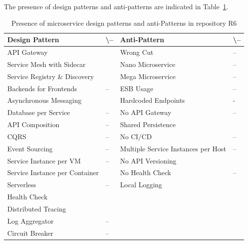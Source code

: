 \documentclass{Configuration_Files/PoliMi3i_thesis}
\newcommand{\cmark}{\ding{51}}%
\begin{document}
The presence of design patterns and anti-patterns are indicated in Table~\ref{table:R6_result}.

\begin{table}[H]
\centering 
    \begin{tabular}{ 
  | >{\centering\arraybackslash} m{16em} 
  | >{\centering\arraybackslash} m{2.2em} 
  | >{\centering\arraybackslash} m{16em} 
  | >{\centering\arraybackslash} m{2.2em} | }
    \hline
    \rowcolor{bluepoli!40}
    \textbf{Design Pattern} & \cmark \textbackslash – & \textbf{Anti-Pattern} & \cmark \textbackslash – \T\B \\
    \hline \hline
    API Gateway & \cmark & Wrong Cut & – \T\B\\
    \hline
    \rowcolor{bluepoli!10}
    Service Mesh with Sidecar & \cmark & Nano Microservice & – \T\B \\
    \hline
    Service Registry \& Discovery & \cmark & Mega Microservice & – \T\B \\
    \hline
    \rowcolor{bluepoli!10}
    Backends for Frontends & – & ESB Usage & – \T\B \\
    \hline
    Asynchronous Messaging & \cmark & Hardcoded Endpoints & - \T\B \\
    \hline
    \rowcolor{bluepoli!10}
    Database per Service & – & No API Gateway & – \T\B \\
    \hline
    API Composition & – & Shared Persistence & \cmark \T\B \\
    \hline
    \rowcolor{bluepoli!10}
    CQRS & – & No CI/CD & – \T\B \\
    \hline
    Event Sourcing & – & Multiple Service Instances per Host & – \T\B \\
    \hline
    \rowcolor{bluepoli!10}
    Service Instance per VM & – & No API Versioning & \cmark \T\B \\
    \hline
    Service Instance per Container & \cmark & No Health Check & – \T\B \\
    \hline
    \rowcolor{bluepoli!10}
    Serverless & – & Local Logging & \cmark \T\B \\
    \hline
    Health Check & \cmark &  & \T\B \\
    \hline
    \rowcolor{bluepoli!10}
    Distributed Tracing & \cmark & & \T\B \\
    \hline
    Log Aggregator & – &  & \T\B \\
    \hline
    \rowcolor{bluepoli!10}
    Circuit Breaker & – &  & \T\B \\
    \hline
    \end{tabular}
    \\[10pt]
    \caption{Presence of microservice design patterns and anti-Patterns in repository R6}
    \label{table:R6_result}
\end{table}
\end{document}
